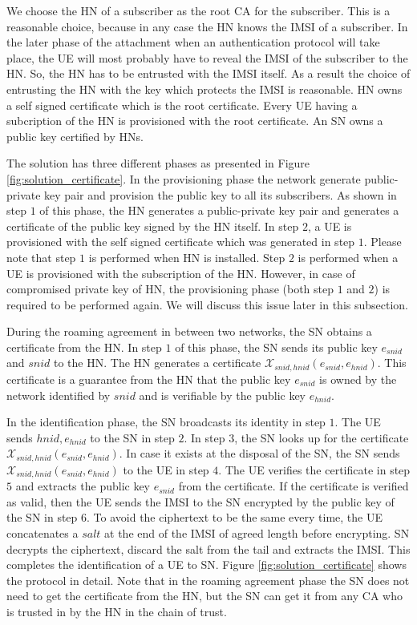 \documentclass[lnicst,sechang,a4paper]{svmultln}
\begin{document}
We choose the HN of a subscriber as the root CA for the subscriber. This is a reasonable choice, because in any case the HN knows the IMSI of a subscriber. In the later phase of the attachment when an authentication protocol will take place, the UE will most probably have to reveal the IMSI of the subscriber to the HN. So, the HN has to be entrusted with the IMSI itself. As a result the choice of entrusting the HN with the key which protects the IMSI is reasonable. HN owns a self signed certificate which is the root certificate. Every UE having a subcription of the HN is provisioned with the root certificate. An SN owns a public key certified by HNs. 

The solution has three different phases as presented in Figure \ref{fig:solution_certificate}. In the provisioning phase the network generate public-private key pair and provision the public key to all its subscribers. As shown in step $1$ of this phase, the HN generates a public-private key pair and generates a certificate of the public key signed by the HN itself.  In step $2$, a UE is provisioned with the self signed certificate which was generated in step $1$. Please note that step $1$ is performed when HN is installed. Step $2$ is performed when a UE is provisioned with the subscription of the HN. However, in case of compromised private key of HN, the provisioning phase (both step $1$ and $2$) is required to be performed again. We will discuss this issue later in this subsection. 

During the roaming agreement in between two networks, the SN obtains a certificate from the HN. In step $1$ of this phase, the SN sends its public key $e_{snid}$ and $snid$ to the HN. The HN generates a certificate $\mathcal{X}_{snid,hnid} (e_{snid},e_{hnid})$. This certificate is a guarantee from the HN that the public key $e_{snid}$ is owned by the network identified by $snid$ and is verifiable by the public key $e_{hnid}$.

In the identification phase, the SN broadcasts its identity in step $1$. The UE sends $hnid,e_{hnid}$ to the SN in step $2$. In step $3$, the SN looks up for the certificate $\mathcal{X}_{snid,hnid} (e_{snid},e_{hnid})$. In case it exists at the disposal of the SN, the SN sends $\mathcal{X}_{snid,hnid} (e_{snid},e_{hnid})$ to the UE in step $4$. The UE verifies the certificate in step $5$ and extracts the public key $e_{snid}$ from the certificate. If the certificate is verified as valid, then the UE sends the IMSI to the SN encrypted by the public key of the SN in step $6$. To avoid the ciphertext to be the same every time, the UE concatenates a $salt$ at the end of the IMSI of agreed length before encrypting. SN decrypts the ciphertext, discard the salt from the tail and extracts the IMSI. This completes the identification of a UE to SN. Figure \ref{fig:solution_certificate} shows the protocol in detail. Note that in the roaming agreement phase the SN does not need to get the certificate from the HN, but the SN can get it from any CA who is trusted in by the HN in the chain of trust.
\end{document}
